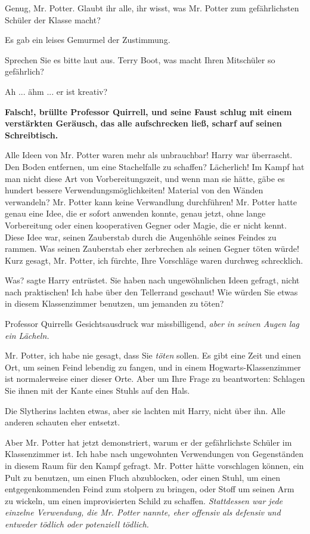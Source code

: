 \glqq{}Genug, Mr. Potter. Glaubt ihr alle, ihr wisst, was Mr. Potter zum
gefährlichsten Schüler der Klasse macht?\grqq{}

Es gab ein leises Gemurmel der Zustimmung.

\glqq{}Sprechen Sie es bitte laut aus. Terry Boot, was macht Ihren Mitschüler so
gefährlich?\grqq{}

\glqq{}Ah ... ähm ... er ist kreativ?\grqq{}

\textbf{\grqq{}Falsch!\grqq{}, brüllte Professor Quirrell, und seine Faust
schlug mit einem verstärkten Geräusch, das alle aufschrecken ließ, scharf auf
seinen Schreibtisch.}

\glqq{}Alle Ideen von Mr. Potter waren mehr als unbrauchbar!\grqq{} Harry war
überrascht. \glqq{}Den Boden entfernen, um eine Stachelfalle zu schaffen?
Lächerlich! Im Kampf hat man nicht diese Art von Vorbereitungszeit, und wenn man
sie hätte, gäbe es hundert bessere Verwendungsmöglichkeiten! Material von den
Wänden verwandeln? Mr. Potter kann keine Verwandlung durchführen! Mr. Potter
hatte genau eine Idee, die er sofort anwenden konnte, genau jetzt, ohne lange
Vorbereitung oder einen kooperativen Gegner oder Magie, die er nicht kennt.
Diese Idee war, seinen Zauberstab durch die Augenhöhle seines Feindes zu rammen.
Was seinen Zauberstab eher zerbrechen als seinen Gegner töten würde! Kurz
gesagt, Mr. Potter, ich fürchte, Ihre Vorschläge waren durchweg
schrecklich.\grqq{}

\glqq{}Was?\grqq{} sagte Harry entrüstet. \glqq{}Sie haben nach ungewöhnlichen
Ideen gefragt, nicht nach praktischen! Ich habe über den Tellerrand geschaut!
Wie würden Sie etwas in diesem Klassenzimmer benutzen, um jemanden zu
töten?\grqq{}

Professor Quirrells Gesichtsausdruck war missbilligend, \emph{aber in seinen
Augen lag ein Lächeln.}

\glqq{}Mr. Potter, ich habe nie gesagt, dass Sie \emph{töten} sollen. Es gibt
eine Zeit und einen Ort, um seinen Feind lebendig zu fangen, und in einem
Hogwarts-Klassenzimmer ist normalerweise einer dieser Orte. Aber um Ihre Frage
zu beantworten: Schlagen Sie ihnen mit der Kante eines Stuhls auf den
Hals.\grqq{}

Die Slytherins lachten etwas, aber sie lachten mit Harry, nicht über ihn. Alle
anderen schauten eher entsetzt.

\glqq{}Aber Mr. Potter hat jetzt demonstriert, warum er der gefährlichste Schüler
im Klassenzimmer ist. Ich habe nach ungewohnten Verwendungen von Gegenständen in
diesem Raum für den Kampf gefragt. Mr. Potter hätte vorschlagen können, ein Pult
zu benutzen, um einen Fluch abzublocken, oder einen Stuhl, um einen
entgegenkommenden Feind zum stolpern zu bringen, oder Stoff um seinen Arm zu
wickeln, um einen improvisierten Schild zu schaffen. \emph{Stattdessen war jede
einzelne Verwendung, die Mr. Potter nannte, eher offensiv als defensiv und
entweder tödlich oder potenziell tödlich.}\grqq{}

